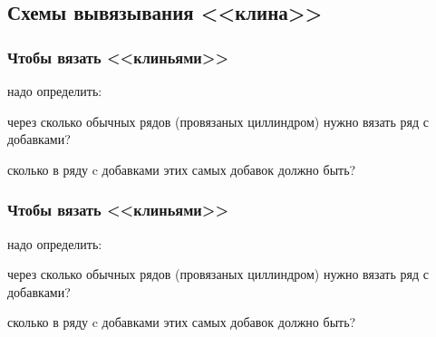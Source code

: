 \subsection{Схемы вывязывания <<клина>>}

\begin{frame}
    \frametitle{Чтобы вязать <<клиньями>>}

	надо определить:
    \begin{center}
        \item через сколько обычных рядов (провязаных циллиндром) нужно вязать ряд с добавками?
		\item сколько в ряду c добавками этих самых добавок должно быть?
    \end{center}
\end{frame}

\begin{frame}
    \frametitle{Чтобы вязать <<клиньями>>}

	надо определить:
    \begin{center}
        \item через сколько обычных рядов (провязаных циллиндром) нужно вязать ряд с добавками?
		\item сколько в ряду c добавками этих самых добавок должно быть?
    \end{center}
\end{frame}


%


